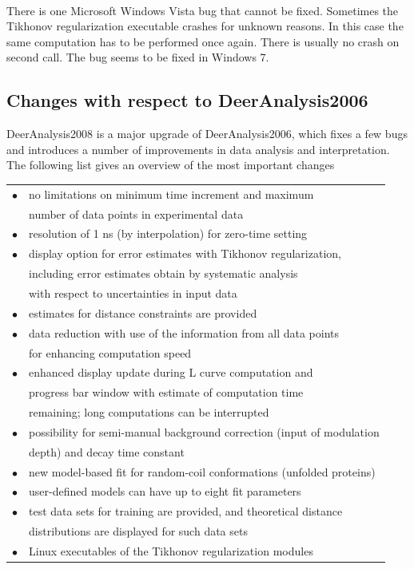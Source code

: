 \documentclass{article}
\begin{document}
\vspace{10pt}

There is one Microsoft Windows Vista\textsuperscript{\textregistered} bug that cannot be fixed. Sometimes the Tikhonov regularization executable crashes for unknown reasons. In this case the same computation has to be performed once again. There is usually no crash on second call. The bug seems to be fixed in Windows 7.

\subsection{Changes with respect to DeerAnalysis2006}
\label{changes_2006_1}

DeerAnalysis2008 is a major upgrade of DeerAnalysis2006, which fixes a few bugs and introduces a number of improvements in data analysis and interpretation. The following list gives an overview of the most important changes    

\begin{tabular}{ll}
\noalign{\smallskip}
$\bullet$ & no limitations on minimum time increment and maximum \\ & number of data points in experimental data\\
$\bullet$ & resolution of 1 ns (by interpolation) for zero-time setting \\
$\bullet$ & display option for error estimates with Tikhonov regularization, \\ & including error estimates obtain by systematic analysis \\ & with respect to uncertainties in input data \\
$\bullet$ & estimates for distance constraints are provided\\
$\bullet$ & data reduction with use of the information from all data points\\ & for enhancing computation speed\\
$\bullet$ & enhanced display update during L curve computation and \\ & progress bar window with estimate of computation time \\ & remaining; long computations can be interrupted\\
$\bullet$ & possibility for semi-manual background correction (input of modulation \\ & depth) and decay time constant\\
$\bullet$ & new model-based fit for random-coil conformations (unfolded proteins)\\
$\bullet$ & user-defined models can have up to eight fit parameters\\
$\bullet$ & test data sets for training are provided, and theoretical distance\\ & distributions are displayed for such data sets\\
$\bullet$ & Linux executables of the Tikhonov regularization modules\\
\end{tabular}
\end{document}
